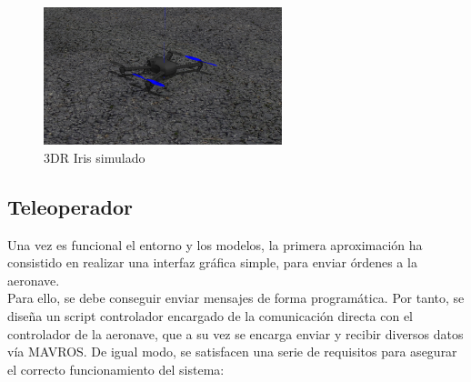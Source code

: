 \begin{figure} [H]
	\begin{center}
	\includegraphics[height=4cm]{imagenes/cap4/1_px4_drone_gz.png}
	\end{center}
	\caption[3DR Iris simulado]{3DR Iris simulado}
	\label{fig:3dr_iris}
\end{figure}

\subsection{Teleoperador}
\label{subsec:teleoperador}

Una vez es funcional el entorno y los modelos, la primera aproximación ha consistido en realizar una interfaz gráfica simple, para enviar órdenes a la aeronave.\\

Para ello, se debe conseguir enviar mensajes de forma programática. Por tanto, se diseña un script controlador encargado de la comunicación directa con el controlador de la aeronave, que a su vez se encarga enviar y recibir diversos datos vía MAVROS. De igual modo, se satisfacen una serie de requisitos para asegurar el correcto funcionamiento del sistema:

